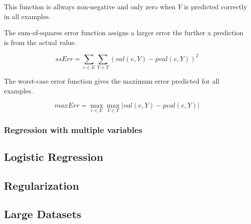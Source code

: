 This function is allways non-negative and only zero when $Y$ is predicted correctly in all examples. 

The sum-of-squares error function assigns a larger error the further a prediction is from the actual value.

$$ssErr = \sum_{e \in E}\sum_{Y \in T} (val(e,Y) - pval(e,Y))^2$$

The worst-case error function gives the maximum error predicted for all examples.

$$maxErr = \max_{e \in E}\max_{Y \in T} | val(e,Y) - pval(e,Y) |$$

\begin{flushright}
\cite[p. 290-291]{AI2010}
\end{flushright}




\subsubsection{Regression with multiple variables}

\subsection{Logistic Regression}


\subsection{Regularization}


\subsection{Large Datasets}












